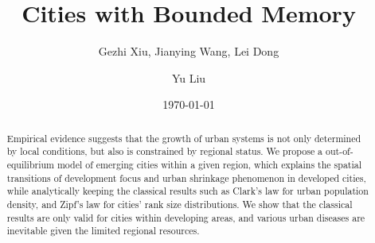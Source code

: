 \documentclass[reprint,unsortedaddress,amsmath,amssymb,aps,prl,fixfloat,showkeys]{revtex4-2}
\begin{document}
\title{Cities with Bounded Memory}
\author{Gezhi Xiu, Jianying Wang, Lei Dong}
\author{Yu Liu}
\date{\today}

\begin{abstract}
	Empirical evidence suggests that the growth of urban systems is not only determined by local conditions, but also is constrained by regional status. We propose a out-of-equilibrium model of emerging cities within a given region, which explains the spatial transitions of development focus and urban shrinkage phenomenon in developed cities, while analytically keeping the classical results such as Clark's law for urban population density, and Zipf's law for cities' rank size distributions. We show that the classical results are only valid for cities within developing areas, and various urban diseases are inevitable given the limited regional resources. 
\end{abstract}

\maketitle
\end{document}

